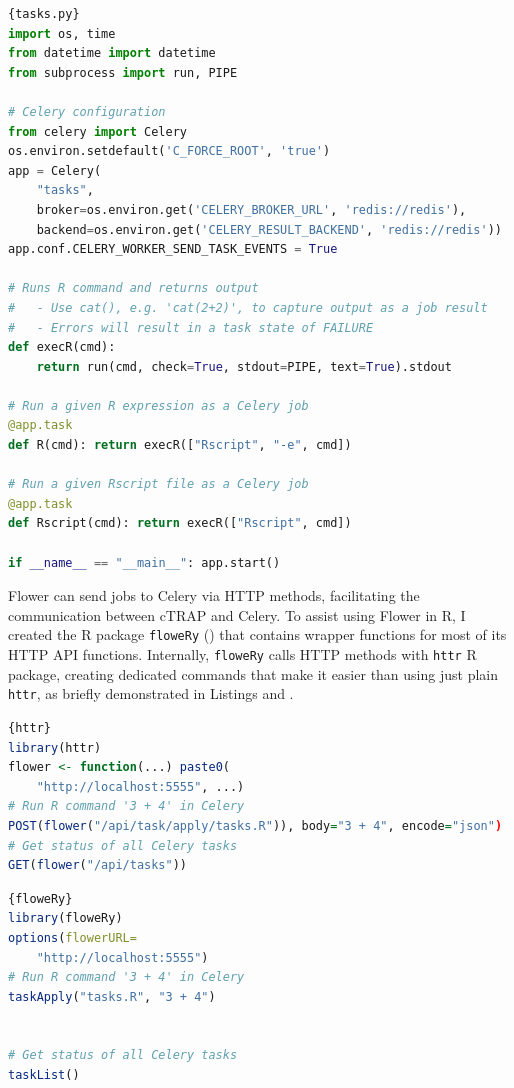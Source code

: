 \begin{lstlisting}[language=python,caption=An example \texttt{tasks.py} file to run R commands or Rscript files via Celery.,label={lst:tasks.py},morekeywords={import},keywordstyle=\bfseries]{tasks.py}
import os, time
from datetime import datetime
from subprocess import run, PIPE

# Celery configuration
from celery import Celery
os.environ.setdefault('C_FORCE_ROOT', 'true')
app = Celery(
    "tasks",
    broker=os.environ.get('CELERY_BROKER_URL', 'redis://redis'),
    backend=os.environ.get('CELERY_RESULT_BACKEND', 'redis://redis'))
app.conf.CELERY_WORKER_SEND_TASK_EVENTS = True

# Runs R command and returns output
#   - Use cat(), e.g. 'cat(2+2)', to capture output as a job result
#   - Errors will result in a task state of FAILURE
def execR(cmd):
    return run(cmd, check=True, stdout=PIPE, text=True).stdout

# Run a given R expression as a Celery job
@app.task
def R(cmd): return execR(["Rscript", "-e", cmd])

# Run a given Rscript file as a Celery job
@app.task
def Rscript(cmd): return execR(["Rscript", cmd])

if __name__ == "__main__": app.start()
\end{lstlisting}

Flower can send jobs to Celery via HTTP methods, facilitating the communication between cTRAP and Celery. To assist using Flower in R, I created the R package \texttt{floweRy} () that contains wrapper functions for most of its HTTP API functions. Internally, \texttt{floweRy} calls HTTP methods with \texttt{httr} R package, creating dedicated commands that make it easier than using just plain \texttt{httr}, as briefly demonstrated in Listings  and .

\noindent\begin{minipage}{.48\textwidth}
\begin{lstlisting}[caption=Job submission with \texttt{httr}.,language=R,label={lst:httr}]{httr}
library(httr)
flower <- function(...) paste0(
    "http://localhost:5555", ...)
# Run R command '3 + 4' in Celery
POST(flower("/api/task/apply/tasks.R")), body="3 + 4", encode="json")
# Get status of all Celery tasks
GET(flower("/api/tasks"))
\end{lstlisting}
\end{minipage}\hfill
\begin{minipage}{.48\textwidth}
\begin{lstlisting}[caption=Job submission with \texttt{floweRy}.,language=R,label={lst:floweRy}]{floweRy}
library(floweRy)
options(flowerURL=
    "http://localhost:5555")
# Run R command '3 + 4' in Celery
taskApply("tasks.R", "3 + 4")


# Get status of all Celery tasks
taskList()
\end{lstlisting}
\end{minipage}

